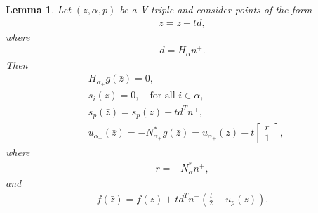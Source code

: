 \documentclass{article}
\newtheorem{lemma}{Lemma}
\begin{document}
	\begin{lemma}\label{lemma of z}
		Let $(z, \alpha, p)$ be a V-triple and consider points of the form
		\begin{align}\label{definition of z-}
			\bar{z} = z + td,
		\end{align}
		where
		\begin{align}\label{definition of d}
			d = H_{\alpha}n^{+}.
		\end{align}
		Then
		\begin{align}
			& H_{\alpha_{+}} g(\bar{z}) = 0,\\
			& s_{i}(\bar{z}) = 0, \quad \text{for all } i \in \alpha,\\
			& s_{p}(\bar{z}) = s_{p}(z) + td^{T}n^{+},\\
			& u_{\alpha_{+}}(\bar{z}) = -N_{\alpha_{+}}^{\ast} g(\bar{z}) = u_{\alpha_{+}}(z) - t
			\begin{bmatrix}
				r\\
				1
			\end{bmatrix}, \label{definition of u}
		\end{align}
		where
		\begin{align}\label{definition of r}
			r = -N_{\alpha}^{\ast}n^{+},
		\end{align}
		and
		\begin{align}
			f(\bar{z}) = f(z) + td^{T}n^{+}\left(\frac{t}{2} - u_{p}(z)\right).
		\end{align}
	\end{lemma}
	
\end{document}
